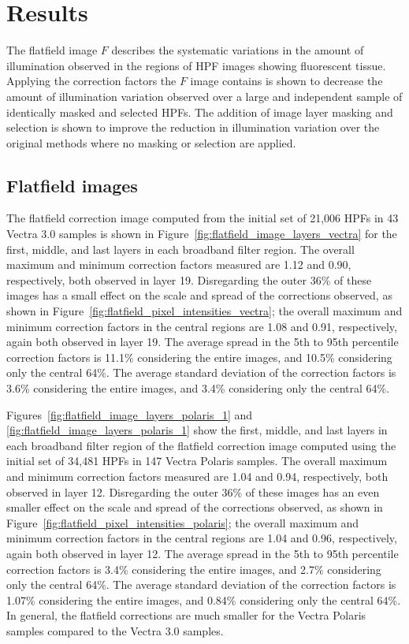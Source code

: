 \documentclass[letterpaper,11pt]{article}
\newcommand{\reffig}[1]{Figure~\ref{#1}}
\begin{document}
\section{Results}
\label{sec:results}

The flatfield image $F$ describes the systematic variations in the amount of illumination observed in the regions of HPF images showing fluorescent tissue. Applying the correction factors the $F$ image contains is shown to decrease the amount of illumination variation observed over a large and independent sample of identically masked and selected HPFs. The addition of image layer masking and selection is shown to improve the reduction in illumination variation over the original methods where no masking or selection are applied.

\subsection{Flatfield images}
\label{ssec:flatfield_images}

The flatfield correction image computed from the initial set of 21,006 HPFs in 43 Vectra 3.0 samples is shown in \reffig{fig:flatfield_image_layers_vectra} for the first, middle, and last layers in each broadband filter region. The overall maximum and minimum correction factors measured are 1.12 and 0.90, respectively, both observed in layer 19. Disregarding the outer 36\% of these images has a small effect on the scale and spread of the corrections observed, as shown in \reffig{fig:flatfield_pixel_intensities_vectra}; the overall maximum and minimum correction factors in the central regions are 1.08 and 0.91, respectively, again both observed in layer 19. The average spread in the 5th to 95th percentile correction factors is 11.1\% considering the entire images, and 10.5\% considering only the central 64\%. The average standard deviation of the correction factors is 3.6\% considering the entire images, and 3.4\% considering only the central 64\%. 

Figures~\ref{fig:flatfield_image_layers_polaris_1} and \ref{fig:flatfield_image_layers_polaris_1} show the first, middle, and last layers in each broadband filter region of the flatfield correction image computed using the initial set of 34,481 HPFs in 147 Vectra Polaris samples. The overall maximum and minimum correction factors measured are 1.04 and 0.94, respectively, both observed in layer 12. Disregarding the outer 36\% of these images has an even smaller effect on the scale and spread of the corrections observed, as shown in \reffig{fig:flatfield_pixel_intensities_polaris}; the overall maximum and minimum correction factors in the central regions are 1.04 and 0.96, respectively, again both observed in layer 12. The average spread in the 5th to 95th percentile correction factors is 3.4\% considering the entire images, and 2.7\% considering only the central 64\%. The average standard deviation of the correction factors is 1.07\% considering the entire images, and 0.84\% considering only the central 64\%. In general, the flatfield corrections are much smaller for the Vectra Polaris samples compared to the Vectra 3.0 samples. 
\end{document}
